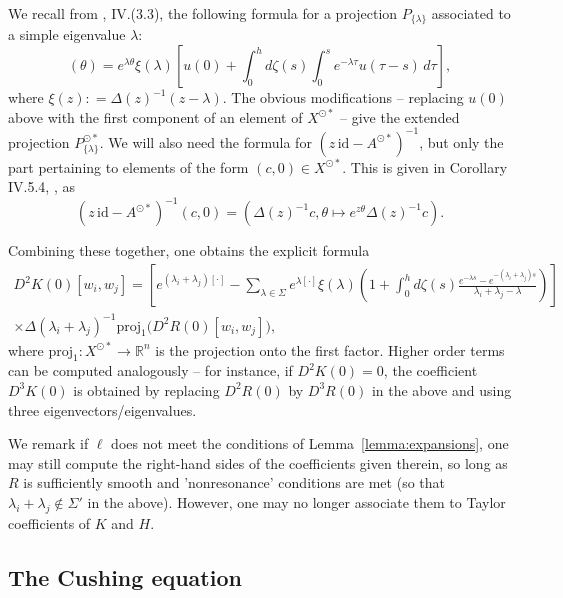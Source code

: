 \documentclass[a4paper, 12pt, oneside, reqno, notitlepage]{amsart}
\theoremstyle{plain}
\theoremstyle{definition}
\theoremstyle{remark}
\begin{document}
We recall from \cite{diekmann2012delay}, IV.(3.3), the following formula for a projection $P_{\{\lambda\}}$ associated to a simple eigenvalue $\lambda$: 
\begin{equation}
    [P_{\{\lambda\}} u](\theta) = e^{\lambda \theta} \xi(\lambda) \left[ u(0) + \int_0^h d\zeta(s) \int_0^s e^{-\lambda \tau} u(\tau-s) \, d\tau \right] ,
    \label{eq:P_lambda}
\end{equation}
where $\xi(z) : = \Delta(z)^{-1} (z-\lambda)$.
The obvious modifications -- replacing $u(0)$ above with the first component of an element of $X^{\odot *}$ -- give the extended projection $P^{\odot *}_{\{\lambda\}}$.
We will also need the formula for $(z \, \mathrm{id} - A^{\odot *})^{-1}$, but only the part pertaining to elements of the form $(c,0) \in X^{\odot *}$.
This is given in Corollary IV.5.4, \cite{diekmann2012delay}, as 
\begin{displaymath}
    (z \, \mathrm{id} - A^{\odot *})^{-1} (c,0) = ( \Delta(z)^{-1}c,\theta \mapsto e^{z\theta} \Delta(z)^{-1}c).
\end{displaymath}

Combining these together, one obtains the explicit formula
\begin{multline}
    D^2K(0)[w_i,w_j] = \left[ e^{(\lambda_i + \lambda_j) [\cdot]} - \sum_{\lambda \in \Sigma} e^{\lambda[ \cdot]} \xi(\lambda) \left( 1 + \int_0^h d\zeta (s) \frac{e^{-\lambda s}-e^{-(\lambda_i + \lambda_j) s}}{\lambda_i + \lambda_j - \lambda} \right) \right] \\ \times \Delta(\lambda_i + \lambda_j)^{-1} \mathrm{proj}_1 \big(D^2R(0)[w_i,w_j] \big),
    \label{eq:D2K}
\end{multline}
where $\mathrm{proj}_1:X^{\odot *} \to \mathbb{R}^n$ is the projection onto the first factor.
Higher order terms can be computed analogously -- for instance, if $D^2K(0) = 0$, the coefficient $D^3K(0)$ is obtained by replacing $D^2R(0)$ by $D^3R(0)$ in the above and using three eigenvectors/eigenvalues.


We remark if $\ell$ does not meet the conditions of Lemma~\ref{lemma:expansions}, one may still compute the right-hand sides of the coefficients given therein, so long as $R$ is sufficiently smooth and 'nonresonance' conditions are met (so that $\lambda_i+\lambda_j \notin \Sigma'$ in the above).
However, one may no longer associate them to Taylor coefficients of $K$ and $H$.



\subsection{The Cushing equation}
\label{sect:example1}
\end{document}
